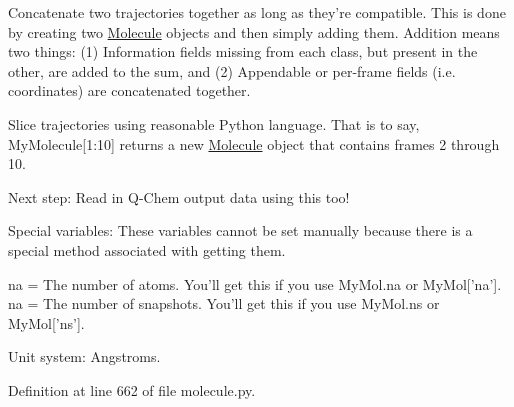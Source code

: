 \begin{DoxyItemize}
\item \-Concatenate two trajectories together as long as they're compatible. \-This is done by creating two \hyperlink{classforcebalance_1_1molecule_1_1Molecule}{\-Molecule} objects and then simply adding them. \-Addition means two things\-: (1) \-Information fields missing from each class, but present in the other, are added to the sum, and (2) \-Appendable or per-\/frame fields (i.\-e. coordinates) are concatenated together.
\end{DoxyItemize}


\begin{DoxyItemize}
\item \-Slice trajectories using reasonable \-Python language. \-That is to say, \-My\-Molecule\mbox{[}1\-:10\mbox{]} returns a new \hyperlink{classforcebalance_1_1molecule_1_1Molecule}{\-Molecule} object that contains frames 2 through 10.
\end{DoxyItemize}

\-Next step\-: \-Read in \-Q-\/\-Chem output data using this too!

\-Special variables\-: \-These variables cannot be set manually because there is a special method associated with getting them.

na = \-The number of atoms. \-You'll get this if you use \-My\-Mol.\-na or \-My\-Mol\mbox{[}'na'\mbox{]}. na = \-The number of snapshots. \-You'll get this if you use \-My\-Mol.\-ns or \-My\-Mol\mbox{[}'ns'\mbox{]}.

\-Unit system\-: \-Angstroms. 

\-Definition at line 662 of file molecule.\-py.



